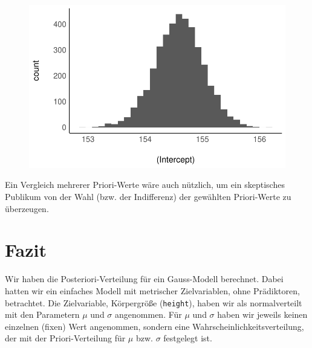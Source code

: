 \documentclass[
  a4paper,
  DIV=11]{scrreprt}
\theoremstyle{definition}
\theoremstyle{remark}
\begin{document}
\begin{figure}[H]

{\centering \includegraphics{./gauss_files/figure-pdf/unnamed-chunk-8-1.pdf}

}

\end{figure}

Ein Vergleich mehrerer Priori-Werte wäre auch nützlich, um ein
skeptisches Publikum von der Wahl (bzw. der Indifferenz) der gewählten
Priori-Werte zu überzeugen.

\hypertarget{fazit-2}{%
\section{Fazit}\label{fazit-2}}

Wir haben die Posteriori-Verteilung für ein Gauss-Modell berechnet.
Dabei hatten wir ein einfaches Modell mit metrischer Zielvariablen, ohne
Prädiktoren, betrachtet. Die Zielvariable, Körpergröße
(\texttt{height}), haben wir als normalverteilt mit den Parametern
\(\mu\) und \(\sigma\) angenommen. Für \(\mu\) und \(\sigma\) haben wir
jeweils keinen einzelnen (fixen) Wert angenommen, sondern eine
Wahrscheinlichkeitsverteilung, der mit der Priori-Verteilung für \(\mu\)
bzw. \(\sigma\) festgelegt ist.
\end{document}
